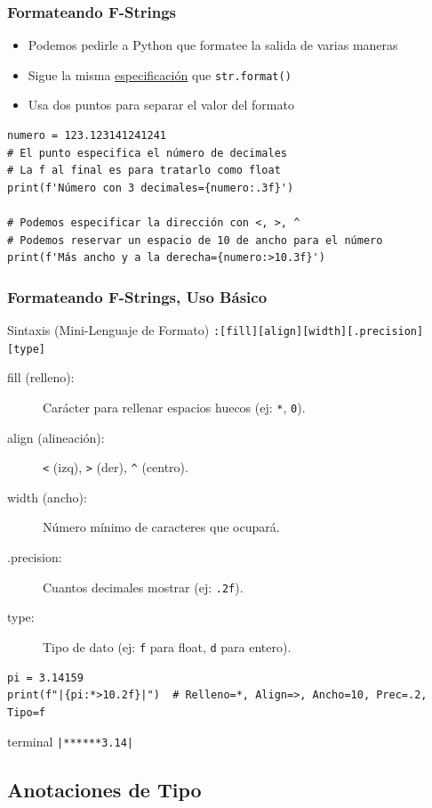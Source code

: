 \documentclass[11pt]{beamer}
\newcommand{\terminal}[1]{
    \vspace{-0.2em}
    \begin{beamercolorbox}[wd=\linewidth, sep=0.3em, rounded=false, shadow=false]{terminal}
    \texttt{#1}
    \end{beamercolorbox}
    \vspace{0.2em}
}
\begin{document}
\begin{frame}[fragile]\frametitle{Formateando F-Strings}
\begin{itemize}
\item Podemos pedirle a Python que formatee la salida de varias maneras
\item Sigue la misma \href{https://docs.python.org/3/library/string.html#format-specification-mini-language}{\color{blue}\underline{especificación}} que \lstinline|str.format()|
\item Usa dos puntos para separar el valor del formato
\end{itemize}
\begin{lstlisting}[basicstyle=\small]
numero = 123.123141241241
# El punto especifica el número de decimales
# La f al final es para tratarlo como float
print(f'Número con 3 decimales={numero:.3f}')

# Podemos especificar la dirección con <, >, ^
# Podemos reservar un espacio de 10 de ancho para el número
print(f'Más ancho y a la derecha={numero:>10.3f}')
\end{lstlisting}
\end{frame}

\begin{frame}[fragile]\frametitle{Formateando F-Strings, Uso Básico}
\begin{block}{Sintaxis (Mini-Lenguaje de Formato)}
\centering\verb|:[fill][align][width][.precision][type]|
\end{block}
\begin{description}
\item[fill (relleno):] Carácter para rellenar espacios huecos (ej: \lstinline|*|, \lstinline|0|).
\item[align (alineación):] \lstinline|<| (izq), \lstinline|>| (der), \lstinline|^| (centro).
\item[width (ancho):] Número mínimo de caracteres que ocupará.
\item[.precision:] Cuantos decimales mostrar (ej: \lstinline|.2f|).
\item[type:] Tipo de dato (ej: \lstinline|f| para float, \lstinline|d| para entero).
\end{description}
\begin{lstlisting}[basicstyle=\tiny]
pi = 3.14159
print(f"|{pi:*>10.2f}|")  # Relleno=*, Align=>, Ancho=10, Prec=.2, Tipo=f
\end{lstlisting}
\terminal{|******3.14|}
\end{frame}


\subsection{Anotaciones de Tipo}
\end{document}
